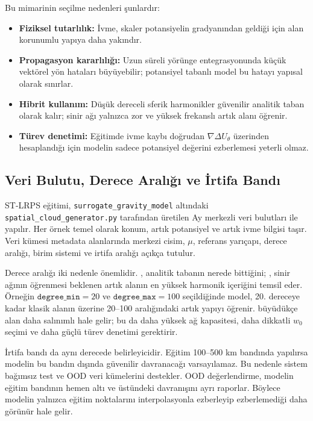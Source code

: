 Bu mimarinin seçilme nedenleri şunlardır:
\begin{itemize}
    \item \textbf{Fiziksel tutarlılık:} İvme, skaler potansiyelin gradyanından geldiği için alan korunumlu yapıya daha yakındır.
    \item \textbf{Propagasyon kararlılığı:} Uzun süreli yörünge entegrasyonunda küçük vektörel yön hataları büyüyebilir; potansiyel tabanlı model bu hatayı yapısal olarak sınırlar.
    \item \textbf{Hibrit kullanım:} Düşük dereceli sferik harmonikler güvenilir analitik taban olarak kalır; sinir ağı yalnızca zor ve yüksek frekanslı artık alanı öğrenir.
    \item \textbf{Türev denetimi:} Eğitimde ivme kaybı doğrudan \(\nabla \Delta U_{\theta}\) üzerinden hesaplandığı için modelin sadece potansiyel değerini ezberlemesi yeterli olmaz.
\end{itemize}

\subsection{Veri Bulutu, Derece Aralığı ve İrtifa Bandı}

ST-LRPS eğitimi, \texttt{surrogate\_gravity\_model} altındaki \texttt{spatial\_cloud\_generator.py} tarafından üretilen Ay merkezli veri bulutları ile yapılır. Her örnek temel olarak konum, artık potansiyel ve artık ivme bilgisi taşır. Veri kümesi metadata alanlarında merkezi cisim, \(\mu\), referans yarıçapı, derece aralığı, birim sistemi ve irtifa aralığı açıkça tutulur.

Derece aralığı iki nedenle önemlidir. , analitik tabanın nerede bittiğini; , sinir ağının öğrenmesi beklenen artık alanın en yüksek harmonik içeriğini temsil eder. Örneğin \(\texttt{degree\_min}=20\) ve \(\texttt{degree\_max}=100\) seçildiğinde model, 20. dereceye kadar klasik alanın üzerine 20--100 aralığındaki artık yapıyı öğrenir.  büyüdükçe alan daha salınımlı hale gelir; bu da daha yüksek ağ kapasitesi, daha dikkatli \(w_0\) seçimi ve daha güçlü türev denetimi gerektirir.

İrtifa bandı da aynı derecede belirleyicidir. Eğitim 100--500 km bandında yapılırsa modelin bu bandın dışında güvenilir davranacağı varsayılamaz. Bu nedenle sistem bağımsız test ve OOD veri kümelerini destekler. OOD değerlendirme, modelin eğitim bandının hemen altı ve üstündeki davranışını ayrı raporlar. Böylece modelin yalnızca eğitim noktalarını interpolasyonla ezberleyip ezberlemediği daha görünür hale gelir.

